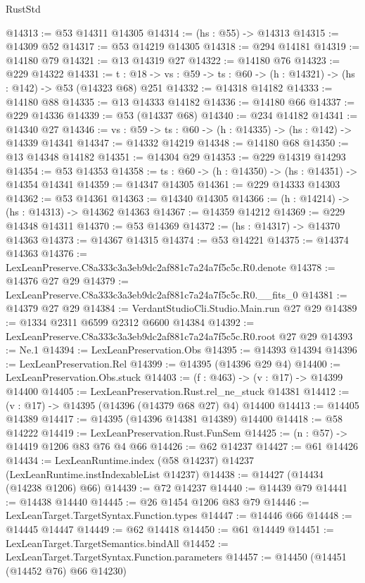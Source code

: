 \begin{lexlean}{RustStd}
\begin{coremodule}
@14313 := @53 @14311 @14305
@14314 := (hs : @55) -> @14313
@14315 := @14309 @52
@14317 := @53 @14219 @14305
@14318 := @294 @14181
@14319 := @14180 @79
@14321 := @13 @14319 @27
@14322 := @14180 @76
@14323 := @229 @14322
@14331 := {t : @18} ->
  {vs : @59} -> {ts : @60} -> (h : @14321) -> (hs : @142) -> @53 (@14323 @68) @251
@14332 := @14318 @14182
@14333 := @14180 @88
@14335 := @13 @14333 @14182
@14336 := @14180 @66
@14337 := @229 @14336
@14339 := @53 (@14337 @68)
@14340 := @234 @14182
@14341 := @14340 @27
@14346 := {vs : @59} -> {ts : @60} -> (h : @14335) -> (hs : @142) -> @14339 @14341
@14347 := @14332 @14219
@14348 := @14180 @68
@14350 := @13 @14348 @14182
@14351 := @14304 @29
@14353 := @229 @14319 @14293
@14354 := @53 @14353
@14358 := {ts : @60} -> (h : @14350) -> (hs : @14351) -> @14354 @14341
@14359 := @14347 @14305
@14361 := @229 @14333 @14303
@14362 := @53 @14361
@14363 := @14340 @14305
@14366 := (h : @14214) -> (hs : @14313) -> @14362 @14363
@14367 := @14359 @14212
@14369 := @229 @14348 @14311
@14370 := @53 @14369
@14372 := (hs : @14317) -> @14370 @14363
@14373 := @14367 @14315
@14374 := @53 @14221
@14375 := @14374 @14363
@14376 := LexLeanPreserve.C8a333c3a3eb9dc2af881c7a24a7f5c5c.R0.denote
@14378 := @14376 @27 @29
@14379 := LexLeanPreserve.C8a333c3a3eb9dc2af881c7a24a7f5c5c.R0.__fits_0
@14381 := @14379 @27 @29
@14384 := VerdantStudioCli.Studio.Main.run @27 @29
@14389 := @1334 @2311 @6599 @2312 @6600 @14384
@14392 := LexLeanPreserve.C8a333c3a3eb9dc2af881c7a24a7f5c5c.R0.root @27 @29
@14393 := Ne.{1}
@14394 := LexLeanPreservation.Obs
@14395 := @14393 @14394
@14396 := LexLeanPreservation.Rel
@14399 := @14395 (@14396 @29 @4)
@14400 := LexLeanPreservation.Obs.stuck
@14403 := (f : @463) -> (v : @17) -> @14399 @14400
@14405 := LexLeanPreservation.Rust.rel_ne_stuck @14381
@14412 := (v : @17) -> @14395 (@14396 (@14379 @68 @27) @4) @14400
@14413 := @14405 @14389
@14417 := @14395 (@14396 @14381 @14389) @14400
@14418 := @58 @14222
@14419 := LexLeanPreservation.Rust.FunSem
@14425 := (n : @57) -> @14419 @1206 @83 @76 @4 @66
@14426 := @62 @14237
@14427 := @61 @14426
@14434 := LexLeanRuntime.index (@58 @14237) @14237 (LexLeanRuntime.instIndexableList @14237)
@14438 := @14427 (@14434 (@14238 @1206) @66)
@14439 := @72 @14237
@14440 := @14439 @79
@14441 := @14438 @14440
@14445 := @26 @1454 @1206 @83 @79
@14446 := LexLeanTarget.TargetSyntax.Function.types
@14447 := @14446 @66
@14448 := @14445 @14447
@14449 := @62 @14418
@14450 := @61 @14449
@14451 := LexLeanTarget.TargetSemantics.bindAll
@14452 := LexLeanTarget.TargetSyntax.Function.parameters
@14457 := @14450 (@14451 (@14452 @76) @66 @14230)

\end{coremodule}
\end{lexlean}
